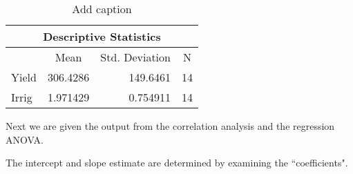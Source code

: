 

\begin{center}
\begin{table}[htbp]
  \centering
  \caption{Add caption}
    \begin{tabular}{|rrrr|}
    \hline
    \multicolumn{4}{c}{Descriptive Statistics}  \\
    \hline %
          & \multicolumn{1}{|c|}{Mean} & \multicolumn{1}{|c|}{Std. Deviation} & \multicolumn{1}{|c|}{N} \\
    \multicolumn{1}{|l|}{Yield} & 306.4286 & 149.6461 & 14 \\
    \multicolumn{1}{|l|}{Irrig} & 1.971429 & 0.754911 & 14 \\
    \hline
    \end{tabular}%

\end{table}%
\end{center}

Next we are given the output from the correlation analysis and the regression ANOVA.


The intercept and slope estimate are determined by examining the ``coefficients".












